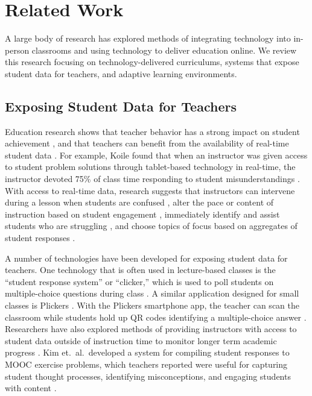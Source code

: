\documentclass{sigchi}
\begin{document}
\section{Related Work}
A large body of research has explored methods of integrating technology into in-person classrooms and using technology to deliver education online. We review this research focusing on technology-delivered curriculums, systems that expose student data for teachers, and adaptive learning environments.

\subsection{Exposing Student Data for Teachers}
Education research shows that teacher behavior has a strong impact on student achievement \cite{Hill2005, Wentzel2002, Reeve2004, Wright1997}, and that teachers can benefit from the availability of real-time student data \cite{Balaam2010, Koile2006, Lazar2007}. For example, Koile found that when an instructor was given access to student problem solutions through tablet-based technology in real-time, the instructor devoted 75\% of class time responding to student misunderstandings \cite{Koile2006}. With access to real-time data, research suggests that instructors can intervene during a lesson when students are confused \cite{Hickey2014}, alter the pace or content of instruction based on student engagement \cite{Balaam2010}, immediately identify and assist students who are struggling \cite{Lazar2007}, and choose topics of focus based on aggregates of student responses \cite{Koile2006}. 

A number of technologies have been developed for exposing student data for teachers. One technology that is often used in lecture-based classes is the ``student response system'' or ``clicker,'' which is used to poll students on multiple-choice questions during class \cite{Dangel08, Lazar2007}. A similar application designed for small classes is Plickers \cite{Plickers}. With the Plickers smartphone app, the teacher can scan the classroom while students hold up QR codes identifying a multiple-choice answer \cite{Plickers}. Researchers have also explored methods of providing instructors with access to student data outside of instruction time to monitor longer term academic progress \cite{Zhang2015, Arnold2012}. Kim et.\ al.\ developed a system for compiling student responses to MOOC exercise problems, which teachers reported were useful for capturing student thought processes, identifying misconceptions, and engaging students with content \cite{Kim2015}.
\end{document}
